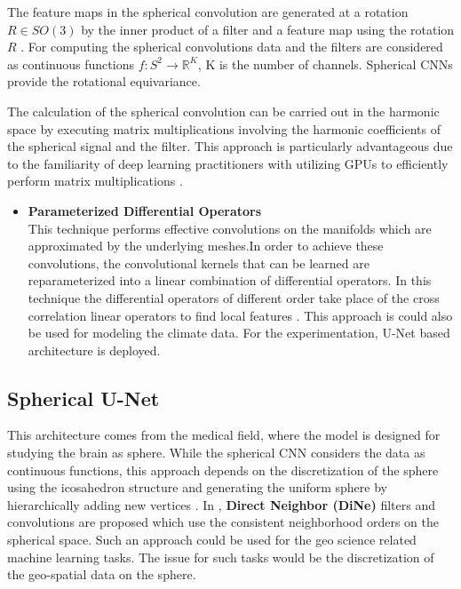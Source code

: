 The feature maps in the spherical convolution are generated at a rotation $R \in SO(3)$ by the inner product of a filter and a feature map using the rotation $R$ \cite{cohen2018spherical}.
For computing the spherical convolutions data and the filters are considered as continuous functions $f: S^2 \rightarrow  \mathbb{R}^K $, K is the number of channels\cite{cohen2018spherical}.
Spherical CNNs provide the rotational equivariance.

The calculation of the spherical convolution can be carried out in the harmonic space by executing matrix multiplications involving the harmonic coefficients of the spherical signal and the filter. This approach is particularly advantageous due to the familiarity of deep learning practitioners with utilizing GPUs to efficiently perform matrix multiplications \cite{towardsdatascienceGeometricDeep}.

\begin{itemize}
    \item \textbf{Parameterized Differential Operators }\\
          This technique performs effective convolutions on the manifolds which are approximated by the underlying meshes.In order to achieve these convolutions, the convolutional kernels that can be learned are reparameterized into a linear combination of differential operators. In this technique the differential operators of different order take place of the cross correlation linear operators to find local features \cite{jiang2019spherical}. This approach is could also be used for modeling the climate data.
          For the experimentation, U-Net based architecture is deployed.

\end{itemize}

\newpage

\subsection{Spherical U-Net}
This architecture comes from the medical field, where the model is designed for studying the brain as sphere. While the spherical CNN \cite{cohen2018spherical} considers the data as continuous functions, this approach depends on the discretization of the sphere using the icosahedron structure and generating the uniform sphere by hierarchically adding new vertices \cite{zhao2019spherical}.
In \cite{zhao2019spherical}, \textbf{Direct Neighbor (DiNe)} filters and convolutions are proposed which use the consistent neighborhood orders on the spherical space\cite{zhao2019spherical}. Such an approach could be used for the geo science related machine learning tasks. The issue for such tasks would be the discretization of the geo-spatial data on the sphere.


